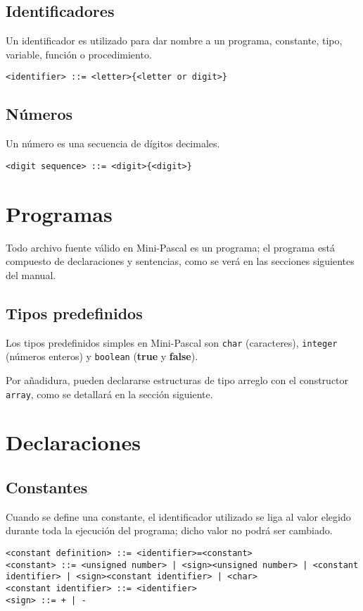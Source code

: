 \documentclass[a4paper,oneside]{report}
\begin{document}
\subsection{Identificadores}

Un identificador es utilizado para dar nombre a un programa, constante, tipo, variable, función o procedimiento.
\begin{verbatim}
<identifier> ::= <letter>{<letter or digit>}
\end{verbatim}

\subsection{Números}
Un número es una secuencia de dígitos decimales.
\begin{verbatim}
<digit sequence> ::= <digit>{<digit>}
\end{verbatim}


\section{Programas}
Todo archivo fuente válido en Mini-Pascal es un programa; el programa está compuesto de declaraciones y sentencias, como se verá en las secciones siguientes del manual.

\subsection{Tipos predefinidos}
Los tipos predefinidos simples en Mini-Pascal son \texttt{char} (caracteres), \texttt{integer} (números enteros) y \texttt{boolean} (\textbf{true} y \textbf{false}).

Por añadidura, pueden declararse estructuras de tipo arreglo con el constructor \texttt{array}, como se detallará en la sección siguiente.

\section{Declaraciones}

\subsection{Constantes}
Cuando se define una constante, el identificador utilizado se liga al valor elegido durante toda la ejecución del programa; dicho valor no podrá ser cambiado.

\begin{verbatim}
<constant definition> ::= <identifier>=<constant>
<constant> ::= <unsigned number> | <sign><unsigned number> | <constant identifier> | <sign><constant identifier> | <char>
<constant identifier> ::= <identifier>
<sign> ::= + | -
\end{verbatim}
\end{document}
